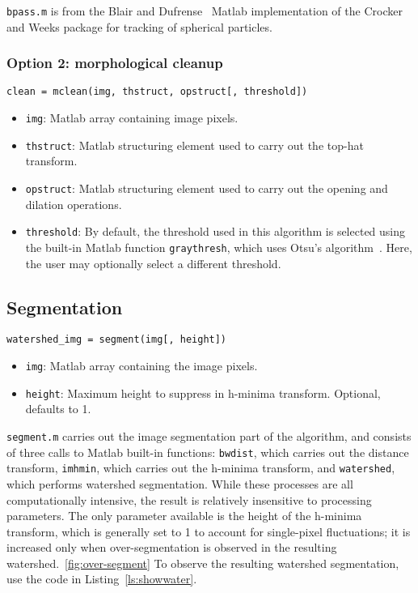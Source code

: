 \texttt{bpass.m} is from the Blair and Dufrense~\cite{blair-matlab} Matlab implementation of the Crocker and Weeks
package for tracking of spherical particles.~\cite{crocker-tracking}

\subsubsection{Option 2: morphological cleanup}

\texttt{clean = mclean(img, thstruct, opstruct[, threshold])}

\begin{itemize}
\item \texttt{img}: Matlab array containing image pixels.
\item \texttt{thstruct}: Matlab structuring element used to carry out the top-hat transform.
\item \texttt{opstruct}: Matlab structuring element used to carry out the opening and dilation operations.
\item \texttt{threshold}: By default, the threshold used in this algorithm is selected using the built-in
Matlab function \texttt{graythresh}, which uses Otsu's algorithm~\cite{?}. Here, the user may optionally
select a different threshold.
\end{itemize}

\subsection{Segmentation}

\texttt{watershed\_img = segment(img[, height])}

\begin{itemize}
\item \texttt{img}: Matlab array containing the image pixels.
\item \texttt{height}: Maximum height to suppress in h-minima transform. Optional, defaults to 1.
\end{itemize}

\texttt{segment.m} carries out the image segmentation part of the algorithm, and consists of three calls to
Matlab built-in functions: \texttt{bwdist}, which carries out the distance transform, 
\texttt{imhmin}, which carries out the h-minima transform, and \texttt{watershed}, which performs watershed
segmentation. While these processes are all computationally intensive, the result is relatively insensitive to
processing parameters. The only parameter available is the height of the h-minima transform, which is generally
set to 1 to account for single-pixel fluctuations; 
it is increased only when over-segmentation is observed in the resulting watershed.~\ref{fig:over-segment}
To observe the resulting watershed segmentation, use the code in Listing~\ref{ls:showwater}.


